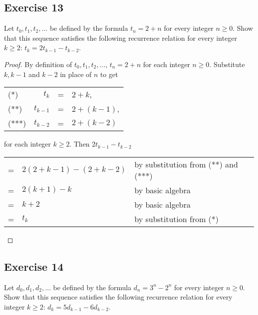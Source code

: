 \documentclass[14pt]{extarticle}
\newcommand{\cy}{\color{cyan}}
\begin{document}
\subsection{Exercise 13}
Let $t_0, t_1, t_2, \ldots$ be defined by the formula $t_n = 2 + n$ for every integer $n \geq 0$. Show that this
sequence satisfies the following recurrence relation for every integer $k \geq 2$: $t_k = 2t_{k - 1} - t_{k - 2}$.

\begin{proof}
    By definition of $t_0, t_1, t_2, \ldots$, $t_n = 2+n$ for each integer $n \geq 0$. Substitute $k, k-1$ and $k-2$ in place of $n$ to get

    \begin{tabular}{lrcl}
        (*)   & $t_k$       & = & $2 + k$,       \\
        (**)  & $t_{k - 1}$ & = & $2 + (k - 1)$, \\
        (***) & $t_{k - 2}$ & = & $2 + (k - 2)$
    \end{tabular}

    for each integer $k \geq 2$. Then $2t_{k - 1} - t_{k - 2}$

    \begin{tabular}{lll}
        = & $2(2 + k - 1) - (2 + k - 2)$ & {\cy by substitution from (**) and (***)} \\
        = & $2(k+1) - k$                 & {\cy by basic algebra}                    \\
        = & $k+2$                        & {\cy by basic algebra}                    \\
        = & $t_k$                        & {\cy by substitution from (*)}            \\
    \end{tabular}
\end{proof}

\subsection{Exercise 14}
Let $d_0, d_1, d_2, \ldots$ be defined by the formula $d_n = 3^n - 2^n$ for every integer $n \geq 0$. Show that this
sequence satisfies the following recurrence relation for every integer $k \geq 2$: $d_k = 5d_{k-1} - 6d_{k-2}$.
\end{document}
